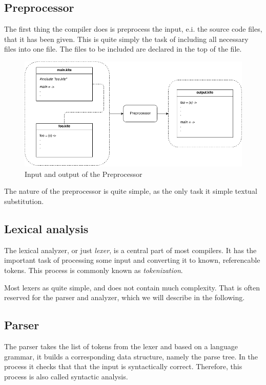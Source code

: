 \subsection{Preprocessor}
The first thing the compiler does is preprocess the input, e.i. the
source code files, that it has been given. This is quite simply the
task of including all necessary files into one file. The files to be
included are declared in the top of the file.

\begin{figure}[H]
  \label{fig:preprocessor}
  \center
  \includegraphics[scale=0.45]{images/preprocessor.png}
  \caption{Input and output of the Preprocessor}
\end{figure}

The nature of the preprocessor is quite simple, as the only task it
simple textual substitution.

\subsection{Lexical analysis}
The lexical analyzer, or just \emph{lexer}, is a central part of most
compilers. It has the important task of processing some input and
converting it to known, referencable tokens. This process is commonly
known as \emph{tokenization}.

Most lexers as quite simple, and does not contain much
complexity. That is often reserved for the parser and analyzer, which
we will describe in the following.

\subsection{Parser}
The parser takes the list of tokens from the lexer and based on a
language grammar, it builds a corresponding data structure, namely the
parse tree. In the process it checks that that the input is
syntactically correct. Therefore, this process is also called syntactic
analysis.

